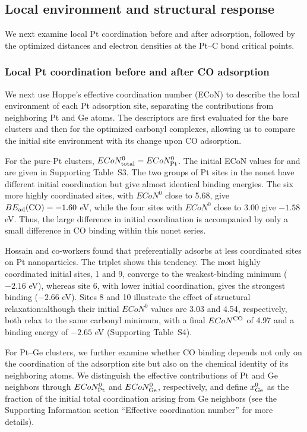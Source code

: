 \subsection{Local environment and structural response}

We next examine local Pt coordination before and after
 adsorption, followed by the optimized  distances and
electron densities at the Pt--C bond critical points.

\subsubsection{Local Pt coordination before and after CO adsorption}
\label{subsec:local_pt_coordination}

We next use Hoppe's effective coordination number (ECoN) to describe the
local environment of each Pt adsorption site, separating the contributions
from neighboring Pt and Ge atoms. The descriptors are first evaluated for the
bare clusters and then for the optimized carbonyl complexes, allowing us to compare the
initial site environment with its change upon CO adsorption.


{For the pure-Pt clusters, $ECoN_{\rm total}^{0}=ECoN_{\rm Pt}^{0}$.
The initial ECoN values for  and  are given in
Supporting Table~S3.
The two groups of Pt sites in the nonet  have different initial
coordination but give almost identical binding energies. The six more highly
coordinated sites, with $ECoN^{0}$ close to 5.68, give
$BE_{\rm ad}(\ce{CO})=-1.60$ eV, while the four sites with $ECoN^{0}$ close
to 3.00 give $-1.58$ eV. Thus, the
large difference in initial coordination is accompanied by only a small
difference in CO binding within this nonet series.}

{Hossain and co-workers found that  preferentially adsorbs at
less coordinated sites on Pt nanoparticles\cite{hossain:lowcoord:2020}.
The triplet  shows this tendency.
The most highly coordinated initial sites,
1 and 9, converge to the weakest-binding minimum ($-2.16$ eV), whereas site
6, with lower initial coordination, gives the strongest binding ($-2.66$ eV).
Sites 8 and 10 illustrate the effect of structural relaxation:although their initial
$ECoN^{0}$ values are 3.03 and 4.54, respectively, both relax to the same
carbonyl minimum, with a final $ECoN^{\ce{CO}}$ of 4.97 and a binding energy
of $-2.65$ eV
(Supporting Table~S4).}

For Pt–Ge clusters, we further examine whether CO binding depends not only on the coordination of the adsorption site but also on the chemical identity of its neighboring atoms. We distinguish the effective contributions of Pt and Ge neighbors through $ECoN_{\rm Pt}^{0}$ and $ECoN_{\rm Ge}^{0}$, respectively, and define $x_{\rm Ge}^{0}$ as the fraction of the initial total coordination arising from Ge neighbors (see the Supporting Information section ``Effective coordination number'' for more details).

